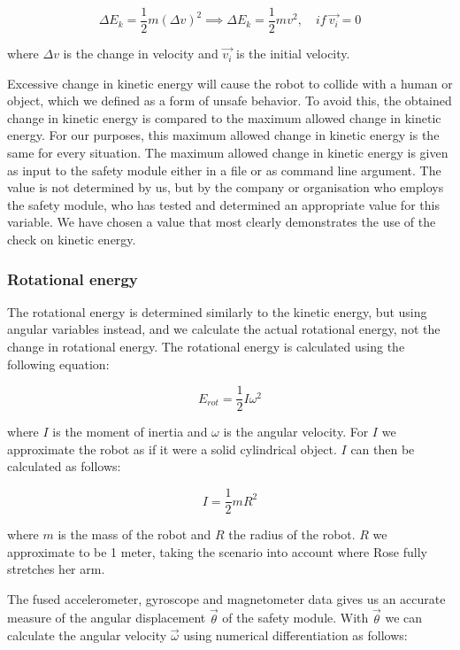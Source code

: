 \documentclass[12pt]{scrreprt}
\begin{document}
\begin{equation} \label{eq:change_ke}
    \Delta E_k = \frac{1}{2}m(\Delta v)^2 \implies \Delta E_k = \frac{1}{2}mv^2,\quad if\ \vec{v_i} = 0
\end{equation}

where $\Delta v$ is the change in velocity and $\vec{v_i}$ is the initial velocity.
\par
Excessive change in kinetic energy will cause the robot to collide with a human or object, which we defined as a form of unsafe behavior. To avoid this, the obtained change in kinetic energy is compared to the maximum allowed change in kinetic energy. For our purposes, this maximum allowed change in kinetic energy is the same for every situation. The maximum allowed change in kinetic energy is given as input to the safety module either in a file or as command line argument. The value is not determined by us, but by the company or organisation who employs the safety module, who has tested and determined an appropriate value for this variable. We have chosen a value that most clearly demonstrates the use of the check on kinetic energy.

\subsubsection{Rotational energy}
\label{Rotational energy}
The rotational energy is determined similarly to the kinetic energy, but using angular variables instead, and we calculate the actual rotational energy, not the change in rotational energy. The rotational energy is calculated using the following equation:

\begin{equation}
    E_{rot} = \frac{1}{2}I\omega^2
\end{equation}

where $I$ is the moment of inertia and $\omega$ is the angular velocity. For $I$ we approximate the robot as if it were a solid cylindrical object. $I$ can then be calculated as follows:

\begin{equation}
    I = \frac{1}{2}mR^2
\end{equation}

where $m$ is the mass of the robot and $R$ the radius of the robot. $R$ we approximate to be 1 meter, taking the scenario into account where Rose fully stretches her arm.
\par
The fused accelerometer, gyroscope and magnetometer data gives us an accurate measure of the angular displacement $\vec{\theta}$ of the safety module. With $\vec{\theta}$ we can calculate the angular velocity $\vec{\omega}$ using numerical differentiation as follows:
\end{document}
